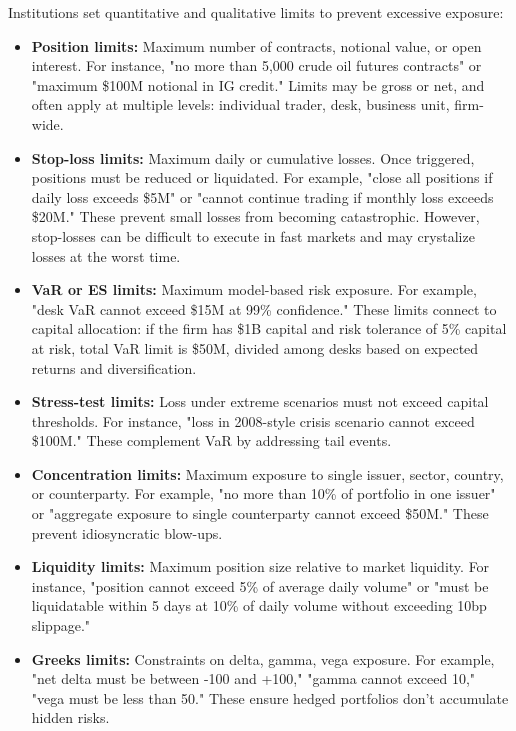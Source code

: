 \documentclass[11pt,a4paper]{article}
\begin{document}
Institutions set quantitative and qualitative limits to prevent excessive exposure:
\begin{itemize}
    \item \textbf{Position limits:} Maximum number of contracts, notional value, or open interest. For instance, "no more than 5,000 crude oil futures contracts" or "maximum \$100M notional in IG credit." Limits may be gross or net, and often apply at multiple levels: individual trader, desk, business unit, firm-wide.
    
    \item \textbf{Stop-loss limits:} Maximum daily or cumulative losses. Once triggered, positions must be reduced or liquidated. For example, "close all positions if daily loss exceeds \$5M" or "cannot continue trading if monthly loss exceeds \$20M." These prevent small losses from becoming catastrophic. However, stop-losses can be difficult to execute in fast markets and may crystalize losses at the worst time.
    
    \item \textbf{VaR or ES limits:} Maximum model-based risk exposure. For example, "desk VaR cannot exceed \$15M at 99\% confidence." These limits connect to capital allocation: if the firm has \$1B capital and risk tolerance of 5\% capital at risk, total VaR limit is \$50M, divided among desks based on expected returns and diversification.
    
    \item \textbf{Stress-test limits:} Loss under extreme scenarios must not exceed capital thresholds. For instance, "loss in 2008-style crisis scenario cannot exceed \$100M." These complement VaR by addressing tail events.
    
    \item \textbf{Concentration limits:} Maximum exposure to single issuer, sector, country, or counterparty. For example, "no more than 10\% of portfolio in one issuer" or "aggregate exposure to single counterparty cannot exceed \$50M." These prevent idiosyncratic blow-ups.
    
    \item \textbf{Liquidity limits:} Maximum position size relative to market liquidity. For instance, "position cannot exceed 5\% of average daily volume" or "must be liquidatable within 5 days at 10\% of daily volume without exceeding 10bp slippage."
    
    \item \textbf{Greeks limits:} Constraints on delta, gamma, vega exposure. For example, "net delta must be between -100 and +100," "gamma cannot exceed 10," "vega must be less than 50." These ensure hedged portfolios don't accumulate hidden risks.
\end{itemize}
\end{document}
